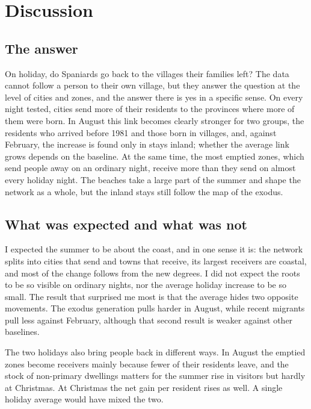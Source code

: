 \section{Discussion}\label{sec:discussion}

\subsection{The answer}

On holiday, do Spaniards go back to the villages their families left? The data cannot follow a person to their own village, but they answer the question at the level of cities and zones, and the answer there is yes in a specific sense. On every night tested, cities send more of their residents to the provinces where more of them were born. In August this link becomes clearly stronger for two groups, the residents who arrived before 1981 and those born in villages, and, against February, the increase is found only in stays inland; whether the average link grows depends on the baseline. At the same time, the most emptied zones, which send people away on an ordinary night, receive more than they send on almost every holiday night. The beaches take a large part of the summer and shape the network as a whole, but the inland stays still follow the map of the exodus.

\subsection{What was expected and what was not}

I expected the summer to be about the coast, and in one sense it is: the network splits into cities that send and towns that receive, its largest receivers are coastal, and most of the change follows from the new degrees. I did not expect the roots to be so visible on ordinary nights, nor the average holiday increase to be so small. The result that surprised me most is that the average hides two opposite movements. The exodus generation pulls harder in August, while recent migrants pull less against February, although that second result is weaker against other baselines.

The two holidays also bring people back in different ways. In August the emptied zones become receivers mainly because fewer of their residents leave, and the stock of non-primary dwellings matters for the summer rise in visitors but hardly at Christmas. At Christmas the net gain per resident rises as well. A single holiday average would have mixed the two.

